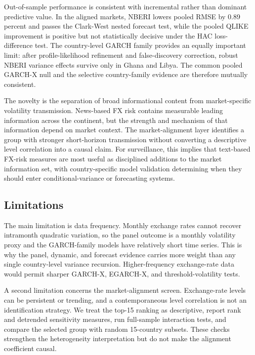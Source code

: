 \documentclass[11pt]{article}
\begin{document}
Out-of-sample performance is consistent with incremental rather than
dominant predictive value. In the aligned markets, NBERI lowers pooled
RMSE by 0.89 percent and passes the Clark-West nested forecast test,
while the pooled QLIKE improvement is positive but not statistically
decisive under the HAC loss-difference test. The country-level GARCH
family provides an equally important limit: after profile-likelihood
refinement and false-discovery correction, robust NBERI variance effects
survive only in Ghana and Libya. The common pooled GARCH-X null and the
selective country-family evidence are therefore mutually consistent.

The novelty is the separation of broad informational content from
market-specific volatility transmission. News-based FX risk contains
measurable leading information across the continent, but the strength
and mechanism of that information depend on market context. The
market-alignment layer identifies a group with stronger short-horizon
transmission without converting a descriptive level correlation into a
causal claim. For surveillance, this implies that text-based FX-risk
measures are most useful as disciplined additions to the market
information set, with country-specific model validation determining when
they should enter conditional-variance or forecasting systems.

\subsection{Limitations}

The main limitation is data frequency. Monthly exchange rates cannot
recover intramonth quadratic variation, so the panel outcome is a
monthly volatility proxy and the GARCH-family models have relatively
short time series. This is why the panel, dynamic, and forecast evidence
carries more weight than any single country-level variance recursion.
Higher-frequency exchange-rate data would permit sharper GARCH-X,
EGARCH-X, and threshold-volatility tests.

A second limitation concerns the market-alignment screen. Exchange-rate
levels can be persistent or trending, and a contemporaneous level
correlation is not an identification strategy. We treat the top-15
ranking as descriptive, report rank and detrended
sensitivity measures, run full-sample interaction tests, and
compare the selected group with random 15-country subsets. These checks
strengthen the heterogeneity interpretation but do not make the
alignment coefficient causal.
\end{document}
